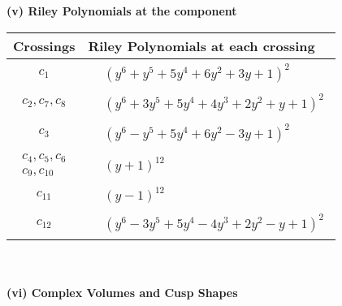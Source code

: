 \documentclass[1p]{elsarticle_modified}
\theoremstyle{definition}
\begin{document}
\newpage\renewcommand{\arraystretch}{1}
\flushleft \textbf{(v) Riley Polynomials at the component}\newline \\
\begin{tabular}{m{50pt}|m{274pt}}
Crossings & \hspace{64pt}Riley Polynomials at each crossing \\
\hline $$\begin{aligned}c_{1}\end{aligned}$$&$\begin{aligned}
&(y^6+y^5+5 y^4+6 y^2+3 y+1)^2
\end{aligned}$\\
\hline $$\begin{aligned}c_{2},c_{7},c_{8}\end{aligned}$$&$\begin{aligned}
&(y^6+3 y^5+5 y^4+4 y^3+2 y^2+y+1)^2
\end{aligned}$\\
\hline $$\begin{aligned}c_{3}\end{aligned}$$&$\begin{aligned}
&(y^6- y^5+5 y^4+6 y^2-3 y+1)^2
\end{aligned}$\\
\hline $$\begin{aligned}c_{4},c_{5},c_{6}\\c_{9},c_{10}\end{aligned}$$&$\begin{aligned}
&(y+1)^{12}
\end{aligned}$\\
\hline $$\begin{aligned}c_{11}\end{aligned}$$&$\begin{aligned}
&(y-1)^{12}
\end{aligned}$\\
\hline $$\begin{aligned}c_{12}\end{aligned}$$&$\begin{aligned}
&(y^6-3 y^5+5 y^4-4 y^3+2 y^2- y+1)^2
\end{aligned}$\\
\hline
\end{tabular}\\~\\
\newpage\flushleft \textbf{(vi) Complex Volumes and Cusp Shapes}
\end{document}
